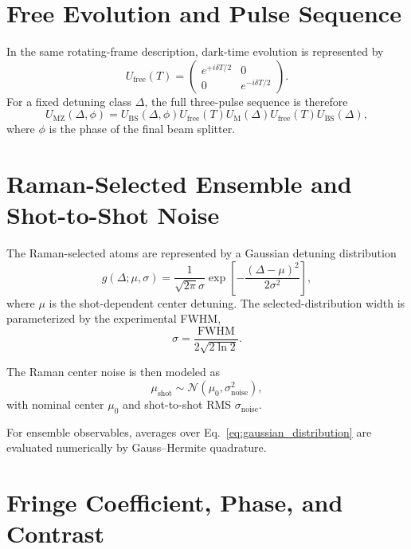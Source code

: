 \documentclass[11pt]{article}
\begin{document}
\section{Free Evolution and Pulse Sequence}
In the same rotating-frame description, dark-time evolution is represented by
\begin{equation}
U_{\mathrm{free}}(T)
=
\begin{pmatrix}
e^{+i\delta T/2} & 0 \\
0 & e^{-i\delta T/2}
\end{pmatrix}.
\label{eq:free_evolution}
\end{equation}
For a fixed detuning class $\Delta$, the full three-pulse sequence is therefore
\begin{equation}
U_{\mathrm{MZ}}(\Delta,\phi)
=
U_{\mathrm{BS}}(\Delta,\phi)
U_{\mathrm{free}}(T)
U_{\mathrm{M}}(\Delta)
U_{\mathrm{free}}(T)
U_{\mathrm{BS}}(\Delta),
\label{eq:full_sequence}
\end{equation}
where $\phi$ is the phase of the final beam splitter.

\section{Raman-Selected Ensemble and Shot-to-Shot Noise}
The Raman-selected atoms are represented by a Gaussian detuning distribution
\begin{equation}
g(\Delta;\mu,\sigma)
=
\frac{1}{\sqrt{2\pi}\sigma}
\exp\!\left[-\frac{(\Delta-\mu)^2}{2\sigma^2}\right],
\label{eq:gaussian_distribution}
\end{equation}
where $\mu$ is the shot-dependent center detuning. The selected-distribution width is parameterized by the experimental FWHM,
\begin{equation}
\sigma = \frac{\mathrm{FWHM}}{2\sqrt{2\ln 2}}.
\label{eq:fwhm_to_sigma}
\end{equation}

The Raman center noise is then modeled as
\begin{equation}
\mu_{\mathrm{shot}}\sim\mathcal{N}\!\left(\mu_0,\sigma_{\mathrm{noise}}^2\right),
\label{eq:center_noise}
\end{equation}
with nominal center $\mu_0$ and shot-to-shot RMS $\sigma_{\mathrm{noise}}$.

For ensemble observables, averages over Eq.~\eqref{eq:gaussian_distribution} are evaluated numerically by Gauss--Hermite quadrature.

\section{Fringe Coefficient, Phase, and Contrast}
\end{document}

